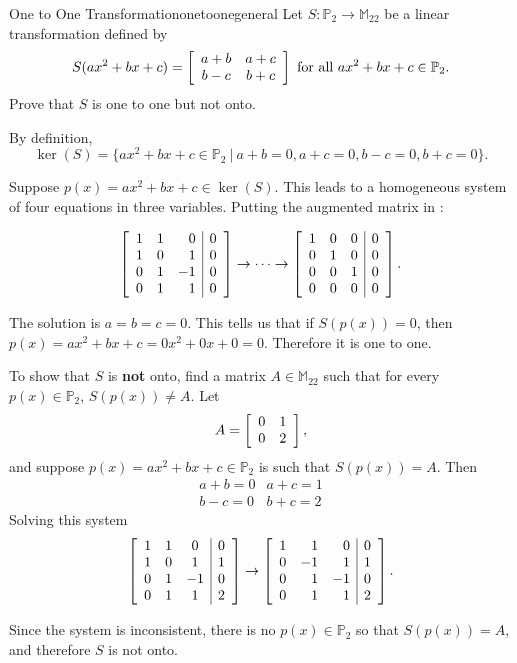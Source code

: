 \begin{example}{One to One Transformation}{onetoonegeneral}
Let $S:\mathbb{P}_2\to\mathbb{M}_{22}$ be a linear transformation
defined by
\[ S(ax^2+bx+c)
=
\left[\begin{array}{cc}
a+b & a+c \\ b-c & b+c \end{array}\right]
\mbox{ for all }
 ax^2+bx+c\in \mathbb{P}_2.\]
Prove that $S$ is one to one but not onto.
\end{example}

\begin{solution}
By definition, 
\[ \ker(S)=\{ax^2+bx+c\in \mathbb{P}_2 ~|~ a+b=0,
a+c=0, b-c=0, b+c=0\}.\]

Suppose $p(x)=ax^2+bx+c\in\ker(S)$.
This leads to a homogeneous system of four equations in three 
variables.  
Putting the augmented matrix in \rref:

\[ \left[\begin{array}{rrr|c}
1 & 1 & 0 & 0  \\
1 & 0 & 1 & 0  \\
0 & 1 & -1 & 0  \\
0 & 1 & 1 & 0  \end{array}\right]
\rightarrow \cdots \rightarrow
\left[\begin{array}{ccc|c}
1 & 0 & 0 & 0  \\
0 & 1 & 0 & 0  \\
0 & 0 & 1 & 0  \\
0 & 0 & 0 & 0  \end{array}\right]. \]

The solution is $a=b=c=0$. This tells us that if $S(p(x)) = 0$, then $p(x) = ax^2+bx+c = 0x^2 + 0x + 0 = 0$. Therefore it is one to one. 

To show that $S$ is \textbf{not} onto, find a matrix $A\in\mathbb{M}_{22}$
such that for every $p(x)\in \mathbb{P}_2$, 
$S(p(x))\neq A$.
Let 
\[ A=\left[\begin{array}{cc} 
0 & 1 \\ 0 & 2 \end{array}\right],\]
and suppose $p(x)=ax^2+bx+c\in \mathbb{P}_2$ is such that
$S(p(x))=A$.
Then
\[ \begin{array}{ll}
a+b=0 & a+c=1 \\ b-c=0 & b+c=2 \end{array}\]
Solving this system
\[ \left[\begin{array}{ccc|c}
1 & 1 & 0 & 0  \\
1 & 0 & 1 & 1  \\
0 & 1 & -1 & 0  \\
0 & 1 & 1 & 2  \end{array}\right]
\rightarrow 
\left[\begin{array}{rrr|r}
1 & 1 & 0 & 0  \\
0 & -1 & 1 & 1  \\
0 & 1 & -1 & 0  \\
0 & 1 & 1 & 2  \end{array}\right]. \]

Since the system is inconsistent, there is no $p(x)\in \mathbb{P}_2$ so
that $S(p(x))=A$, and therefore $S$ is not onto.
\end{solution}

